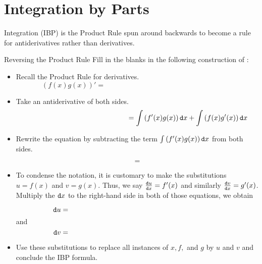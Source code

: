 
\section{Integration by Parts}\label{ibp}

Integration  (IBP) is the Product Rule spun around backwards to become a rule for antiderivatives rather than derivatives.  

\begin{exercise}{Reversing the Product Rule \Coffeecup \Coffeecup }
Fill in the blanks in the following construction of :
\begin{itemize}
\item Recall the Product Rule for derivatives. $$\left( f(x)g(x) \right)'=\hspace{3in} $$
\item Take an antiderivative of both sides.
$$ \hspace{2in} = \int \left( f'(x)g(x) \right) \mathop{}\!\mathtt{d} x + \int \left( f(x)g'(x) \right) \mathop{}\!\mathtt{d} x$$
\item Rewrite the equation by subtracting the term $\int \left( f'(x)g(x) \right) \mathop{}\!\mathtt{d} x$ from both sides.

$$ = $$

\item To condense the notation, it is customary to make the substitutions $u=f(x)$ and $v=g(x)$.  Thus, we say $\frac{\mathop{}\!\mathtt{d} u}{\mathop{}\!\mathtt{d} x}=f'(x) $ and similarly $\frac{\mathop{}\!\mathtt{d} v}{\mathop{}\!\mathtt{d} x}=g'(x) $.  Multiply the $\mathop{}\!\mathtt{d} x$ to the right-hand side in both of those equations, we obtain

$$\dif u = \hspace{3in} $$ and $$ \dif v = \hspace{3in}  $$


\item Use these substitutions to replace all instances of $x, f, $ and $g$ by $u$ and $v$ and conclude the IBP formula.

\end{itemize}
\end{exercise}

